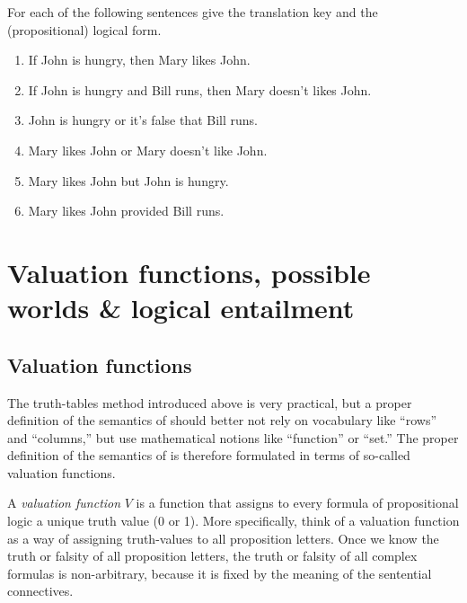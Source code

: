 \documentclass[nobib,nofonts]{tufte-handout}
\newcommand{\proplog}{\acro{PropLog}}
\begin{document}
\bigskip
\noindent \colorbox{mygray}{\centering
  \begin{minipage}{1.0\textwidth}

    \begin{exercise}
      For each of the following sentences give the translation key and the (propositional) logical form.
      \begin{enumerate}[(a.)]
        \item If John is hungry, then Mary likes John.
        \item If John is hungry and Bill runs, then Mary doesn't likes John.
        \item John is hungry or it's false that Bill runs.
        \item Mary likes John or Mary doesn't like John.
        \item Mary likes John but John is hungry.
        \item Mary likes John provided Bill runs.
      \end{enumerate}
    \end{exercise}

  \end{minipage}
}

\newpage

\section{Valuation functions, possible worlds \& logical entailment}

\subsection{Valuation functions}

The truth-tables method introduced above is very practical, but a proper definition of the semantics of \proplog should better not rely on vocabulary like ``rows'' and ``columns,'' but use mathematical notions like ``function'' or ``set.''
The proper definition of the semantics of \proplog is therefore formulated in terms of so-called valuation functions.

A \emph{valuation function} $V$ is a function that assigns to every formula of propositional logic a unique truth value (0 or 1).
More specifically, think of a valuation function as a way of assigning truth-values to all proposition letters.
Once we know the truth or falsity of all proposition letters, the truth or falsity of all complex formulas is non-arbitrary, because it is fixed by the meaning of the sentential connectives.
\end{document}

